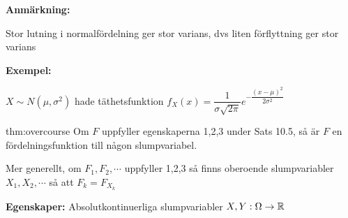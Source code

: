 \par\bigskip
\noindent\textbf{Anmärkning:}\par
\noindent Stor lutning i normalfördelning ger stor varians, dvs liten förflyttning ger stor varians
\par\bigskip
\noindent\textbf{Exempel:}\par
\noindent $X\sim N(\mu, \sigma^2)$ hade täthetsfunktion $f_X(x) = \dfrac{1}{\sigma\sqrt{2\pi}}e^{-\dfrac{(x-\mu)^2}{2\sigma^2}}$
\par\bigskip
\begin{theo}[Överkurs]{thm:overcourse}
  Om $F$ uppfyller egenskaperna 1,2,3 under Sats 10.5, så är $F$ en fördelningsfunktion till någon slumpvariabel.
  \par\bigskip
  \noindent Mer generellt, om $F_1,F_2,\cdots$ uppfyller 1,2,3 så finns oberoende slumpvariabler $X_1,X_2,\cdots$ så att $F_k = F_{X_k}$
\end{theo}
\newpage
\noindent\textbf{Egenskaper:} Absolutkontinuerliga slumpvariabler $X,Y:\Omega\to\mathbb{R}$\par
